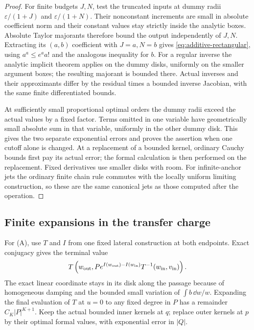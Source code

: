 \begin{proof}
For finite budgets $J,N$, test the truncated inputs at dummy radii
$\varepsilon/(1+J)$ and $\varepsilon/(1+N)$.  Their nonconstant
increments are small in absolute coefficient norm and their constant
values stay strictly inside the analytic boxes.  Absolute Taylor
majorants therefore bound the output independently of $J,N$.
Extracting its $(a,b)$ coefficient with $J=a,N=b$ gives
\eqref{eq:additive-rectangular}, using $a^a\le e^aa!$ and the analogous
inequality for $b$.  For a regular inverse the analytic implicit
theorem applies on the dummy disks, uniformly on the smaller argument
boxes; the resulting majorant is bounded there.  Actual inverses and
their approximants differ by the residual times a bounded inverse
Jacobian, with the same finite differentiated bounds.

At sufficiently small proportional optimal orders the dummy radii
exceed the actual values by a fixed factor.  Terms omitted in one
variable have geometrically small absolute sum in that variable,
uniformly in the other dummy disk.  This gives the two separate
exponential errors and proves the assertion when one cutoff alone is
changed.  At a replacement of a bounded kernel, ordinary Cauchy bounds
first pay its actual error; the formal calculation is then performed
on the replacement.  Fixed derivatives use smaller disks with room.
For infinite-anchor jets the ordinary finite chain rule commutes with
the locally uniform limiting construction, so these are the same
canonical jets as those computed after the operation.
\end{proof}

\subsection{Finite expansions in the transfer charge}

For (A), use $T$ and $I$ from one fixed lateral construction at both
endpoints.  Exact conjugacy gives the terminal value
\begin{equation}\label{eq:additive-A-transfer}
 T\left(w_{\rm out},
 P e^{I(w_{\rm out})-I(w_{\rm in})}
                  T^{-1}(w_{\rm in},v_{\rm in})\right).
\end{equation}
The exact linear coordinate stays in its disk along the passage because
of homogeneous damping and the bounded small variation of
$\int b\,\dd w/w$.  Expanding the final evaluation of $T$ at $u=0$ to any fixed
degree in $P$ has a remainder $C_K|P|^{K+1}$.  Keep the actual bounded
inner kernels at $q$; replace outer kernels at $p$ by their optimal
formal values, with exponential error in $|Q|$.

